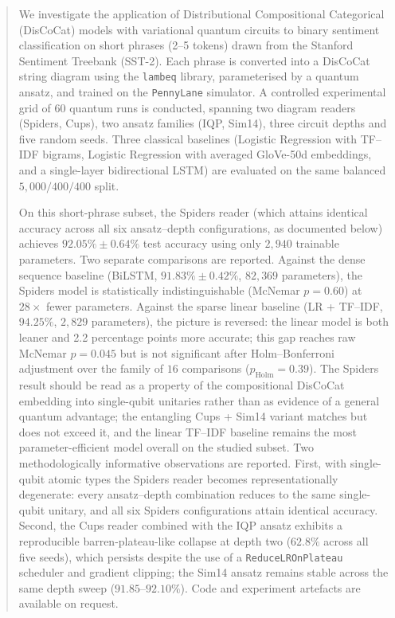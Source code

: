 \documentclass[runningheads]{llncs}
\begin{document}
\begin{abstract}
We investigate the application of Distributional Compositional
Categorical (DisCoCat) models with variational quantum circuits to
binary sentiment classification on short phrases (2--5 tokens) drawn
from the Stanford Sentiment Treebank (SST-2). Each phrase is converted
into a DisCoCat string diagram using the \texttt{lambeq} library,
parameterised by a quantum ansatz, and trained on the \texttt{PennyLane}
simulator. A controlled experimental grid of 60 quantum runs is
conducted, spanning two diagram readers (Spiders, Cups), two ansatz
families (IQP, Sim14), three circuit depths and five random seeds.
Three classical baselines (Logistic Regression with TF--IDF bigrams,
Logistic Regression with averaged GloVe-50d embeddings, and a
single-layer bidirectional LSTM) are evaluated on the same balanced
\(5{,}000/400/400\) split.

On this short-phrase subset, the Spiders reader (which attains
identical accuracy across all six ansatz--depth configurations, as
documented below) achieves \(92.05\% \pm 0.64\%\) test accuracy using
only \(2{,}940\) trainable parameters. Two separate comparisons are
reported. Against the dense sequence baseline (BiLSTM,
\(91.83\% \pm 0.42\%\), \(82{,}369\) parameters), the Spiders model
is statistically indistinguishable (McNemar \(p = 0.60\)) at
\(28\times\) fewer parameters. Against the sparse linear baseline
(LR + TF--IDF, \(94.25\%\), \(2{,}829\) parameters), the picture is
reversed: the linear model is both leaner and 2.2 percentage points
more accurate; this gap reaches raw McNemar \(p = 0.045\) but is not
significant after Holm--Bonferroni adjustment over the family of
\(16\) comparisons (\(p_{\text{Holm}} = 0.39\)). The Spiders result
should be read as a property of the compositional DisCoCat embedding
into single-qubit unitaries rather than as evidence of a general
quantum advantage; the entangling Cups + Sim14 variant matches but
does not exceed it, and the linear TF--IDF baseline remains the most
parameter-efficient model overall on the studied subset. Two
methodologically informative observations are reported. First, with
single-qubit atomic types the Spiders reader becomes representationally
degenerate: every ansatz--depth combination reduces to the same
single-qubit unitary, and all six Spiders configurations attain
identical accuracy. Second, the Cups reader combined with the IQP
ansatz exhibits a reproducible barren-plateau-like collapse at depth two
(\(62.8\%\) across all five seeds), which persists despite the use of a
\texttt{ReduceLROnPlateau} scheduler and gradient clipping; the Sim14
ansatz remains stable across the same depth sweep
(\(91.85\)--\(92.10\%\)). Code and experiment artefacts are available
on request.
\end{abstract}
\end{document}
